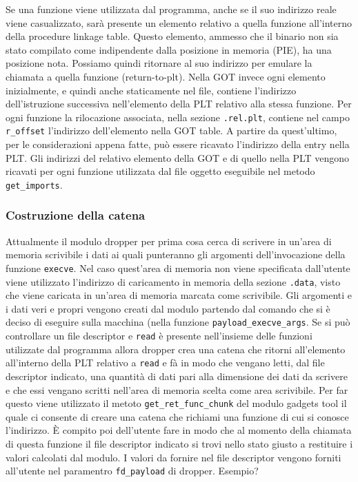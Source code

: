 Se una funzione viene utilizzata dal programma, anche se il suo
indirizzo reale viene casualizzato, sarà presente un elemento relativo
a quella funzione all'interno della procedure linkage table. Questo
elemento, ammesso che il binario non sia stato compilato come
indipendente dalla posizione in memoria (PIE), ha una posizione
nota. Possiamo quindi ritornare al suo indirizzo per emulare la
chiamata a quella funzione (return-to-plt). Nella GOT invece ogni
elemento inizialmente, e quindi anche staticamente nel file, contiene
l'indirizzo dell'istruzione successiva nell'elemento della PLT
relativo alla stessa funzione. Per ogni funzione la rilocazione
associata, nella sezione \lstinline{.rel.plt}, contiene nel campo
\lstinline{r_offset} l'indirizzo dell'elemento nella GOT table. A
partire da quest'ultimo, per le considerazioni appena fatte, può
essere ricavato l'indirizzo della entry nella PLT. Gli indirizzi del
relativo elemento della GOT e di quello nella PLT vengono ricavati per
ogni funzione utilizzata dal file oggetto eseguibile nel metodo
\lstinline{get_imports}.

\subsubsection{Costruzione della catena}

Attualmente il modulo dropper per prima cosa cerca di scrivere in
un'area di memoria scrivibile i dati ai quali punteranno gli argomenti
dell'invocazione della funzione \lstinline{execve}. Nel caso
quest'area di memoria non viene specificata dall'utente viene
utilizzato l'indirizzo di caricamento in memoria della sezione
\lstinline{.data}, visto che viene caricata in un'area di memoria
marcata come scrivibile. Gli argomenti e i dati veri e propri vengono
creati dal modulo partendo dal comando che si è deciso di eseguire
sulla macchina (nella funzione \lstinline{payload_execve_args}. Se si
può controllare un file descriptor e \lstinline{read} è presente
nell'insieme delle funzioni utilizzate dal programma allora dropper
crea una catena che ritorni all'elemento all'interno della PLT
relativo a \lstinline{read} e fà in modo che vengano letti, dal file
descriptor indicato, una quantità di dati pari alla dimensione dei
dati da scrivere e che essi vengano scritti nell'area di memoria
scelta come area scrivibile. Per far questo viene utilizzato il metoto
\lstinline{get_ret_func_chunk} del modulo gadgets tool il quale ci
consente di creare una catena che richiami una funzione di cui si
conosce l'indirizzo. È compito poi dell'utente fare in modo che al
momento della chiamata di questa funzione il file descriptor indicato
si trovi nello stato giusto a restituire i valori calcolati dal
modulo. I valori da fornire nel file descriptor vengono forniti
all'utente nel paramentro \lstinline{fd_payload} di dropper.
Esempio?

